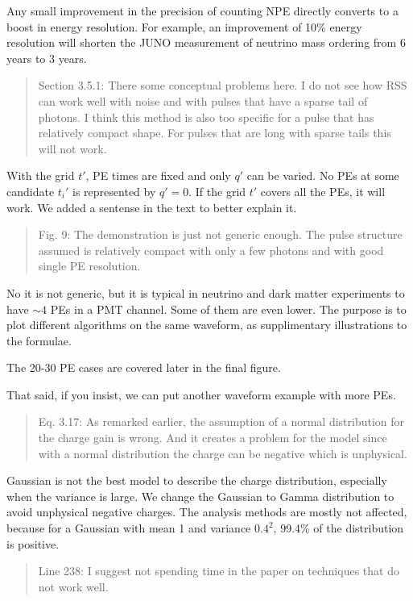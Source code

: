 \documentclass[12pt]{article}
\begin{document}
Any small improvement in the precision of counting NPE directly converts to a boost in energy resolution. For example, an improvement of 10\% energy resolution will shorten the JUNO measurement of neutrino mass ordering from 6 years to 3 years.

\begin{quote}
Section 3.5.1: There some conceptual problems here. I do not see how RSS can work well with noise and with pulses that have a sparse tail of photons. I think this method is also too specific for a pulse that has relatively compact shape. For pulses that are long with sparse tails this will not work.
\end{quote}

With the grid $t'$, PE times are fixed and only $q'$ can be varied.  No PEs at some candidate $t_i'$ is represented by $q'=0$.  If the grid $t'$ covers all the PEs, it will work.  We added a sentense in the text to better explain it.

\begin{quote}
Fig. 9: The demonstration is just not generic enough. The pulse structure assumed is relatively compact with only a few photons and with good single PE resolution.
\end{quote}

No it is not generic, but it is typical in neutrino and dark matter experiments to have $\sim 4$ PEs in a PMT channel.  Some of them are even lower. The purpose is to plot different algorithms on the same waveform, as supplimentary illustrations to the formulae.

The 20-30 PE cases are covered later in the final figure.

That said, if you insist, we can put another waveform example with more PEs.

\begin{quote}
Eq. 3.17: As remarked earlier, the assumption of a normal distribution for the charge gain is wrong. And it creates a problem for the model since with a normal distribution the charge can be negative which is unphysical.
\end{quote}

Gaussian is not the best model to describe the charge distribution, especially when the variance is large. We change the Gaussian to Gamma distribution to avoid unphysical negative charges. The analysis methods are mostly not affected, because for a Gaussian with mean 1 and variance $0.4^2$, 99.4\% of the distribution is positive.

\begin{quote}
Line 238: I suggest not spending time in the paper on techniques that do not work well.
\end{quote}
\end{document}
